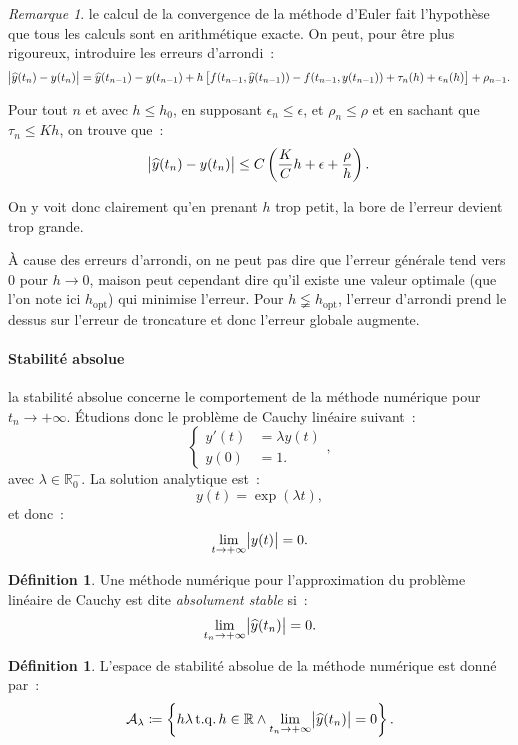 \documentclass{article}
\theoremstyle{definition}
\newtheorem{déf}[thm]{Définition}
\theoremstyle{remark}
\newtheorem*{rmq}{Remarque}
\DeclareMathOperator{\tq}{t.q.}  %
\newcommand{\R}{\mathbb R}
\newcommand{\opt}[1]{{#1}_{\text{opt}}}
\begin{document}
		\begin{rmq} le calcul de la convergence de la méthode d'Euler fait l'hypothèse que tous les calculs sont en arithmétique exacte. On peut, pour être plus
		rigoureux, introduire les erreurs d'arrondi~:
		\[\abs{\widehat y(t_n) - y(t_n)}
			= \widehat y(t_{n-1}) - y(t_{n-1}) + h\left[f(t_{n-1}, \widehat y(t_{n-1})) - f(t_{n-1}, y(t_{n-1})) + \tau_n(h) + \epsilon_n(h)\right] + \rho_{n-1}.\]

		Pour tout $n$ et avec $h \leq h_0$, en supposant $\epsilon_n \leq \epsilon$, et $\rho_n \leq \rho$ et en sachant que $\tau_n \leq Kh$, on trouve que~:
		\[\abs{\widehat y(t_n) - y(t_n)} \leq C\left(\frac KCh + \epsilon + \frac \rho h\right).\]

		On y voit donc clairement qu'en prenant $h$ trop petit, la bore de l'erreur devient trop grande.

		À cause des erreurs d'arrondi, on ne peut pas dire que l'erreur générale tend vers 0 pour $h \to 0$, maison peut cependant dire qu'il existe une valeur
		optimale (que l'on note ici $\opt h$) qui minimise l'erreur. Pour $h \lneqq \opt h$, l'erreur d'arrondi prend le dessus sur l'erreur de troncature et
		donc l'erreur globale augmente.
		\end{rmq}

		\paragraph{Stabilité absolue} la stabilité absolue concerne le comportement de la méthode numérique pour $t_n \to +\infty$. Étudions donc le problème de
		Cauchy linéaire suivant~:
		\[\begin{cases}y'(t) &= \lambda y(t) \\y(0) &= 1.\end{cases},\]
		avec $\lambda \in \R_0^-$. La solution analytique est~:
		\[y(t) = \exp(\lambda t),\]
		et donc~:
		\[\lim_{t \to +\infty}\abs{y(t)} = 0.\]

		\begin{déf} Une méthode numérique pour l'approximation du problème linéaire de Cauchy est dite \emph{absolument stable} si~:
		\[\lim_{t_n \to +\infty}\abs{\widehat y(t_n)} = 0.\]
		\end{déf}

		\begin{déf} L'espace de stabilité absolue de la méthode numérique est donné par~:
		\[\mathcal A_\lambda \coloneqq \left\{h\lambda \tq h \in \R \land \lim_{t_n \to +\infty}\abs{\widehat y(t_n)} = 0\right\}.\]
		\end{déf}
\end{document}

